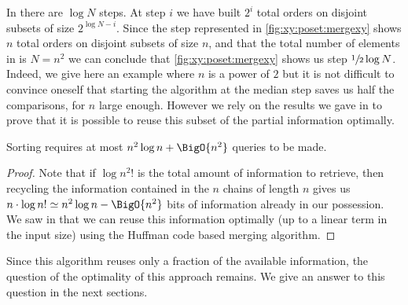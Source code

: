 In \mergesort there are $\log N$ steps. At step $i$ we have
built $2^{i}$ total orders on disjoint subsets of size $2^{\log N - i}$. Since
the step represented in \ref{fig:xy:poset:mergexy} shows $n$ total orders on
disjoint subsets of size $n$, and that the total number of elements in \XY is
$N = n^2$ we can conclude that \ref{fig:xy:poset:mergexy} shows us step
$\sfrac{1}{2} \log N$. Indeed, we give here an example where \(n\) is a power
of \(2\)
but it is not difficult to convince oneself that starting
the algorithm at the median step
saves us half the comparisons, for \(n\) large enough. However we rely on the
results we gave in  to prove that it is possible to
reuse this subset of the partial information optimally.
\begin{theorem}
Sorting \XY requires at most \(n^2 \log n + \BigO{n^2}\) queries to be made.
\end{theorem}
\begin{proof}
Note that if \(\log n^2!\) is the total amount of information to retrieve,
then recycling the information contained in the \(n\) chains of length \(n\)
gives us \(n \cdot \log n! \simeq n^2 \log n - \BigO{n^2}\) bits of information already in our
possession. We saw in  that we can reuse this
information optimally (up to a linear term in the input size) using
the Huffman code based merging algorithm.
\end{proof}

Since this algorithm reuses only a fraction of the available information, the
question of the optimality of this approach remains. We give an answer to this
question in the next sections.
